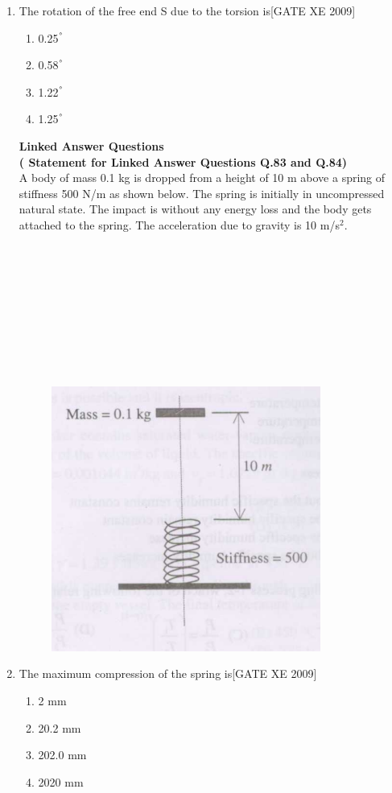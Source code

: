 \documentclass[journal,12pt,onecolumn]{IEEEtran}
\theoremstyle{remark}
\begin{document}
\begin{enumerate}
\item The rotation of the free end S due to the torsion is\hfill[GATE XE 2009]
\begin{multicols}{2}
\begin{enumerate}
    \item 0.25$^\degree$
    \item 0.58$^\degree$
    \item 1.22$^\degree$
    \item 1.25$^\degree$
\end{enumerate}
\end{multicols}





\Large\textbf{ Linked Answer Questions}\\
 \textbf{( Statement for Linked Answer Questions Q.83 and Q.84)}  \\

A body of mass 0.1 kg is dropped from a height of 10 m above a spring of stiffness 500 N/m as shown below. The spring is initially in uncompressed natural state. The impact is without any energy loss and the body gets attached to the spring. The acceleration due to gravity is 10 m/s$^2$.\\\\\\\\\\\\\\\\\\\

\begin{figure} [h]
    \centering
     \includegraphics[width=0.5\columnwidth]{figs/fig26.png}
       
\end{figure}

\item The maximum compression of the spring is\hfill[GATE XE 2009]
\begin{multicols}{2}
\begin{enumerate}
    \item 2 mm
    \item 20.2 mm
    \item 202.0 mm
    \item 2020 mm
\end{enumerate}
\end{multicols}


\end{enumerate}
\end{document}
